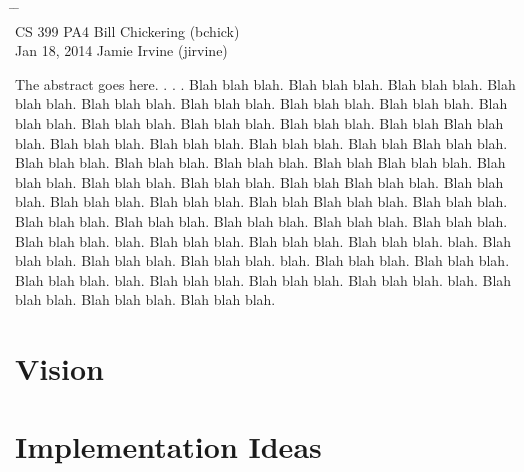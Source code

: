 \documentclass[10pt]{article}
\begin{document}

{\LARGE\bf
\begin{tabbing}
\hspace{2.8in} \= \hspace{1.3in} \= \hspace{1.2in} \= \\

CS 399 \> PA4 \> Bill Chickering (bchick)\\
\normalsize Jan 18, 2014 \> \> Jamie Irvine (jirvine)
\end{tabbing}
}
\vspace{.4in}

The abstract goes here. . . . 
Blah blah blah.  Blah blah blah.  Blah blah blah.  Blah blah blah.  Blah blah
blah.  Blah blah blah.  Blah blah blah.  Blah blah blah.  Blah blah blah.  Blah
blah blah.  Blah blah blah.  Blah blah blah.  Blah blah Blah blah blah.  Blah
blah blah.  Blah blah blah.  Blah blah blah.  Blah blah Blah blah blah.  Blah
blah blah.  Blah blah blah.  Blah blah blah.  Blah blah Blah blah blah.  Blah
blah blah.  Blah blah blah.  Blah blah blah.  Blah blah Blah blah blah.  Blah
blah blah.  Blah blah blah.  Blah blah blah.  Blah blah Blah blah blah.  Blah
blah blah.  Blah blah blah.  Blah blah blah.  Blah blah blah.  Blah blah blah.
Blah blah blah.  Blah blah blah.  blah.  Blah blah blah.  Blah blah blah.  Blah
blah blah.  blah.  Blah blah blah.  Blah blah blah.  Blah blah blah.  blah.
Blah blah blah.  Blah blah blah.  Blah blah blah.  blah.  Blah blah blah.  Blah
blah blah.  Blah blah blah.  blah.  Blah blah blah.  Blah blah blah.  Blah blah
blah.

\section*{Vision}

\section*{Implementation Ideas}
\end{document}
